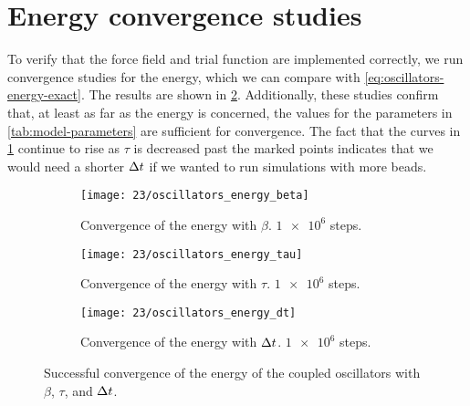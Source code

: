 \section{Energy convergence studies}

\label{sec:oscillators-energy-convergence}

To verify that the force field and trial function are implemented correctly, we run convergence studies for the energy, which we can compare with \cref{eq:oscillators-energy-exact}.
The results are shown in \cref{fig:oscillators-energy}.
Additionally, these studies confirm that, at least as far as the energy is concerned, the values for the parameters in \vref{tab:model-parameters} are sufficient for convergence.
The fact that the curves in \cref{fig:oscillators-energy-tau} continue to rise as $\tau$ is decreased past the marked points indicates that we would need a shorter $\Delta t$ if we wanted to run simulations with more beads.

\begin{figure}
	\setlength{\figspacing}{5 mm}
	\centering
	\begin{subfigure}[b]{\textwidth}
		\texttt{[image: 23/oscillators\_energy\_beta]}
		\caption{
			Convergence of the energy with $\beta$.
			$\num{1e6}$ steps.
		}
		\vspace{\figspacing}
	\end{subfigure}
	\begin{subfigure}[b]{\textwidth}
		\texttt{[image: 23/oscillators\_energy\_tau]}
		\caption{
			Convergence of the energy with $\tau$.
			$\num{1e6}$ steps.
		}
		\label{fig:oscillators-energy-tau}
		\vspace{\figspacing}
	\end{subfigure}
	\begin{subfigure}[b]{\textwidth}
		\texttt{[image: 23/oscillators\_energy\_dt]}
		\caption{
			Convergence of the energy with $\Delta t$.
			$\num{1e6}$ steps.
		}
	\end{subfigure}
	\caption[
		Convergence of energy for coupled oscillators
	]{
		Successful convergence of the energy of the coupled oscillators with $\beta$, $\tau$, and $\Delta t$.
		\explainplotentropy{}
	}
	\label{fig:oscillators-energy}
\end{figure}
